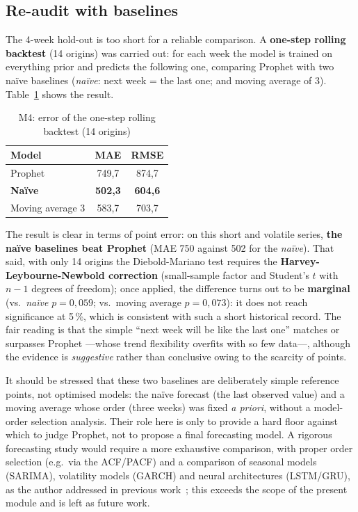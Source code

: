 \subsection{Re-audit with baselines}

The 4-week hold-out is too short for a reliable comparison. A \textbf{one-step rolling
backtest} (14 origins) was carried out: for each week the model is trained on everything prior and predicts the
following one, comparing Prophet with two naïve baselines (\emph{naïve}: next week = the last one;
and moving average of 3). Table~\ref{tab:m4_backtest} shows the result.

\begin{table}[htbp]
\centering
\caption{M4: error of the one-step rolling backtest (14 origins)}
\label{tab:m4_backtest}
\begin{tabular}{lcc}
\toprule
\textbf{Model} & \textbf{MAE} & \textbf{RMSE} \\
\midrule
Prophet        & 749,7 & 874,7 \\
\textbf{Naïve} & \textbf{502,3} & \textbf{604,6} \\
Moving average 3  & 583,7 & 703,7 \\
\bottomrule
\end{tabular}
\end{table}


The result is clear in terms of point error: on this short and volatile series, \textbf{the naïve baselines beat
Prophet} (MAE 750 against 502 for the \emph{naïve}). That said, with only 14 origins the Diebold-Mariano
test requires the \textbf{Harvey-Leybourne-Newbold correction} (small-sample factor and Student's $t$
with $n-1$ degrees of freedom); once applied, the difference turns out to be \textbf{marginal} (vs.\ \emph{naïve}
$p=0{,}059$; vs.\ moving average $p=0{,}073$): it does not reach significance at 5\,\%, which is consistent with such a short
historical record. The fair reading is that the simple ``next week will be like the last one'' matches or
surpasses Prophet ---whose trend flexibility overfits with so few data---, although the evidence is
\emph{suggestive} rather than conclusive owing to the scarcity of points.

It should be stressed that these two baselines are deliberately simple reference points, not optimised models: the naïve forecast (the last observed value) and a moving average whose order (three weeks) was fixed \emph{a priori}, without a model-order selection analysis. Their role here is only to provide a hard floor against which to judge Prophet, not to propose a final forecasting model. A rigorous forecasting study would require a more exhaustive comparison, with proper order selection (e.g.\ via the ACF/PACF) and a comparison of seasonal models (SARIMA), volatility models (GARCH) and neural architectures (LSTM/GRU), as the author addressed in previous work~\cite{gallego2024tfg}; this exceeds the scope of the present module and is left as future work.
